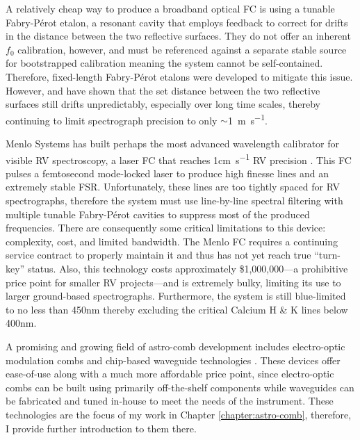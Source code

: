 A relatively cheap way to produce a broadband optical FC is using a tunable Fabry-P\'erot etalon, a resonant cavity that employs feedback to correct for drifts in the distance between the two reflective surfaces. They do not offer an inherent $f_0$ calibration, however, and must be referenced against a separate stable source for bootstrapped calibration \citep{mccracken_single-lock_2014, sturmer_rubidium-traced_2017} meaning the system cannot be self-contained. Therefore, fixed-length Fabry-P\'erot etalons were developed to mitigate this issue. However, \citet{reiners_laser-lock_2014} and \citet{wildi_passive_2012} have shown that the set distance between the two reflective surfaces still drifts unpredictably, especially over long time scales, thereby continuing to limit spectrograph precision to only $\sim$\SI{1}{\meter\per\second}.

Menlo Systems has built perhaps the most advanced wavelength calibrator for visible RV spectroscopy, a laser FC that reaches 1\si{\centi\meter\per\second} RV precision \citep{probst_laser_2014}. This FC pulses a femtosecond mode-locked laser to produce high finesse lines and an extremely stable FSR. Unfortunately, these lines are too tightly spaced for RV spectrographs, therefore the system must use line-by-line spectral filtering with multiple tunable Fabry-P\'erot cavities to suppress most of the produced frequencies. There are consequently some critical limitations to this device: complexity, cost, and limited bandwidth. The Menlo FC requires a continuing service contract to properly maintain it and thus has not yet reach true ``turn-key'' status. Also, this technology costs approximately \$1,000,000---a prohibitive price point for smaller RV projects---and is extremely bulky, limiting its use to larger ground-based spectrographs. Furthermore, the system is still blue-limited to no less than 450\si{\nano\meter} thereby excluding the critical Calcium H \& K lines below 400\si{\nano\meter}.

A promising and growing field of astro-comb development includes electro-optic modulation combs and chip-based waveguide technologies \citep[e.g.][]{carlson_ultrafast_2017, yi_demonstration_2016, obrzud_broadband_2018, obrzud_visible_2019}. These devices offer ease-of-use along with a much more affordable price point, since electro-optic combs can be built using primarily off-the-shelf components while waveguides can be fabricated and tuned in-house to meet the needs of the instrument. These technologies are the focus of my work in Chapter \ref{chapter:astro-comb}, therefore, I provide further introduction to them there.

